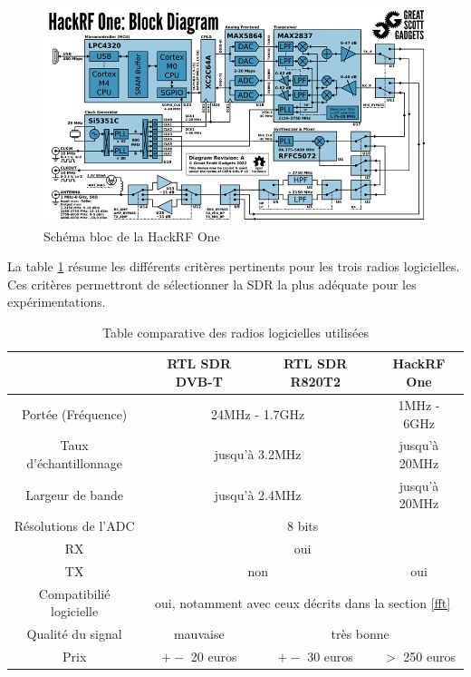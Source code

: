 \begin{figure}[h]
\centering

\includegraphics[scale=0.8]{images/SBhackrf.png}
\caption{Schéma bloc de la HackRF One\protect\footnotemark[10]}\label{term3001}
\end{figure}

 
La table \ref{table1} résume les différents critères pertinents pour les trois radios logicielles. Ces critères permettront de sélectionner la SDR la plus adéquate pour les expérimentations.


\begin{table}[h]
\centering
\begin{adjustbox}{width=1\textwidth}
\begin{tabular}{|c|c|c|c|}
\hline
\multicolumn{1}{|c|}{} & \multicolumn{1}{c|}{RTL SDR DVB-T} & \multicolumn{1}{c|}{RTL SDR R820T2} & \multicolumn{1}{c|}{HackRF One}\\
\hline
Portée (Fréquence) & \multicolumn{2}{c|}{24MHz - 1.7GHz} & 1MHz - 6GHz \\
\hline
Taux d'échantillonnage & \multicolumn{2}{c|}{jusqu'à 3.2MHz} & jusqu'à 20MHz \\
\hline
Largeur de bande & \multicolumn{2}{c|}{jusqu'à 2.4MHz} & jusqu'à 20MHz  \\
\hline
Résolutions de l'ADC & \multicolumn{3}{c|}{8 bits} \\
\hline
RX & \multicolumn{3}{c|}{oui} \\
\hline
TX & \multicolumn{2}{c|}{non} & oui \\
\hline
Compatibilié logicielle & \multicolumn{3}{c|}{oui, notamment avec ceux décrits dans la section \ref{fft}} \\
\hline
Qualité du signal & mauvaise &\multicolumn{2}{c|}{très bonne}\\
\hline
Prix & $+-$ 20 euros & $+-$ 30 euros & $>$ 250 euros \\
\hline
\end{tabular}
\end{adjustbox}
\caption{Table comparative des radios logicielles utilisées}
\label{table1}
\end{table}



